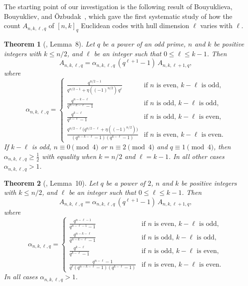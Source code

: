 \documentclass[11pt]{article}
\theoremstyle{plain}
\newtheorem{theorem}{Theorem}
\theoremstyle{remark}
\begin{document}
The starting point of our investigation is the following result of Bouyuklieva,
Bouyukliev, and \"Ozbudak~\cite{BBOz2026}, which gave the first systematic study of
how the count $A_{n,k,\ell,q}$ of $[n,k]_q$ Euclidean codes with hull dimension $\ell$
varies with $\ell$.

\begin{theorem}[\cite{BBOz2026}, Lemma~8]\label{thm:BBO-odd}
Let $q$ be a power of an odd prime, $n$ and $k$ be positive integers with
$k \leq n/2$, and $\ell$ be an integer such that $0 \leq \ell \leq k - 1$. Then
\[
  A_{n,k,\ell,q} = \alpha_{n,k,\ell,q}\,(q^{\ell+1} - 1)\,A_{n,k,\ell+1,q},
\]
where
\[
  \alpha_{n,k,\ell,q} = \begin{cases}
    \displaystyle\frac{q^{n/2-1}}{q^{n/2-1} + \eta((-1)^{n/2})\,q^\ell}
      & \text{if $n$ is even, $k - \ell$ is odd}, \\[8pt]
    \displaystyle\frac{q^{n-k-\ell}}{q^{n-k-\ell} - 1}
      & \text{if $n$ is odd, $k - \ell$ is odd}, \\[8pt]
    \displaystyle\frac{q^{k-\ell}}{q^{k-\ell} - 1}
      & \text{if $n$ is odd, $k - \ell$ is even}, \\[8pt]
    \displaystyle\frac{q^{n/2-\ell}\bigl(q^{n/2-\ell} + \eta((-1)^{n/2})\bigr)}
                       {(q^{n-k-\ell}-1)(q^{k-\ell}-1)}
      & \text{if $n$ is even, $k - \ell$ is even}.
  \end{cases}
\]
If $k - \ell$ is odd, $n \equiv 0 \pmod 4$ or
$n \equiv 2 \pmod 4$ and $q \equiv 1 \pmod 4$, then
$\alpha_{n,k,\ell,q} \geq \tfrac{1}{2}$ with equality when $k = n/2$ and
$\ell = k - 1$. In all other cases $\alpha_{n,k,\ell,q} > 1$.
\end{theorem}

\begin{theorem}[\cite{BBOz2026}, Lemma~10]\label{thm:BBO-even}
Let $q$ be a power of $2$, $n$ and $k$ be positive integers with $k \leq n/2$,
and $\ell$ be an integer such that $0 \leq \ell \leq k - 1$. Then
\[
  A_{n,k,\ell,q} = \alpha_{n,k,\ell,q}\,(q^{\ell+1} - 1)\,A_{n,k,\ell+1,q},
\]
where
\[
  \alpha_{n,k,\ell,q} = \begin{cases}
    \displaystyle\frac{q^{n-\ell-1}}{q^{n-\ell-1} - 1}
      & \text{if $n$ is even, $k - \ell$ is odd}, \\[8pt]
    \displaystyle\frac{q^{n-k-\ell}}{q^{n-k-\ell} - 1}
      & \text{if $n$ is odd, $k - \ell$ is odd}, \\[8pt]
    \displaystyle\frac{q^{k-\ell}}{q^{k-\ell} - 1}
      & \text{if $n$ is odd, $k - \ell$ is even}, \\[8pt]
    \displaystyle\frac{q^{n-\ell}-1}{q^\ell(q^{n-k-\ell}-1)(q^{k-\ell}-1)}
      & \text{if $n$ is even, $k - \ell$ is even}.
  \end{cases}
\]
In all cases $\alpha_{n,k,\ell,q} > 1$.
\end{theorem}
\end{document}
